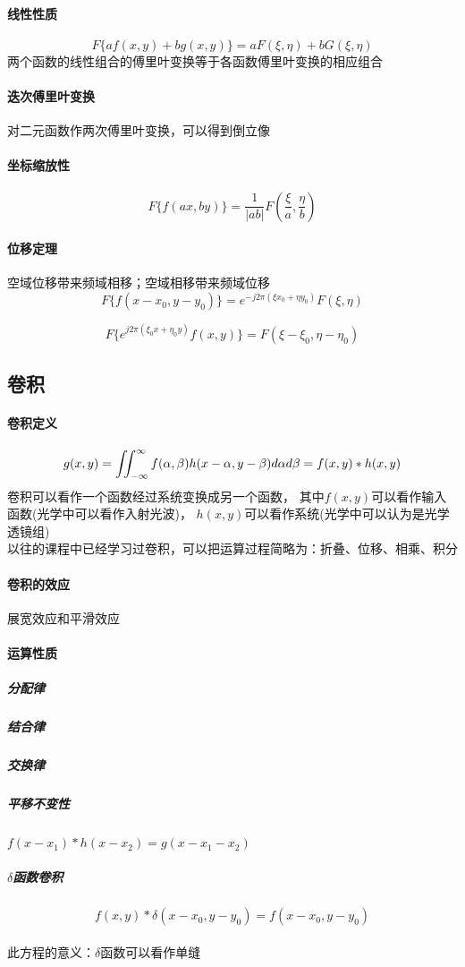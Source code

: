 \documentclass[UTF8]{ctexart}
\newcommand{\f}[2]{\frac{#1}{#2}}%
\begin{document}
\paragraph{线性性质}
\[
    F\{ af(x,y)+bg(x,y)\}=aF(\xi,\eta)+bG(\xi,\eta)
\]
两个函数的线性组合的傅里叶变换等于各函数傅里叶变换的相应组合
\paragraph{迭次傅里叶变换}
对二元函数作两次傅里叶变换，可以得到倒立像
\paragraph{坐标缩放性}
\[
F\{f(ax,by)\} =\f{1}{|ab|}F(\f{\xi}{a},\f{\eta}{b})   
\]
\paragraph{位移定理}空域位移带来频域相移；空域相移带来频域位移\[
F\{f(x-x_{0},y-y_{0})\}=e^{-j2\pi(\xi x_{0}+\eta y_{0})}F(\xi,\eta)    
\]

\[F\{e^{j2\pi(\xi_{0}x+\eta_{0}y)} f(x,y)\}=F(\xi-\xi_{0},\eta-\eta_{0})\]
\subsection{卷积}
\paragraph{卷积定义}\[g(x,y)=\iint_{-\infty}^{\infty}f(\alpha,\beta)h(x-\alpha,y-\beta)d\alpha d\beta \\
=f(x,y)*h(x,y)
\]
卷积可以看作一个函数经过系统变换成另一个函数，
其中$f(x,y)$可以看作输入函数(光学中可以看作入射光波)，
$h(x,y)$可以看作系统(光学中可以认为是光学透镜组)
\\以往的课程中已经学习过卷积，可以把运算过程简略为：折叠、位移、相乘、积分
\paragraph{卷积的效应}展宽效应和平滑效应
\paragraph{运算性质}
\subparagraph{分配律}
\subparagraph{结合律}
\subparagraph{交换律}
\subparagraph{平移不变性}$f(x-x_{1})*h(x-x_{2})=g(x-x_{1}-x_{2})$
\subparagraph{$\delta$函数卷积}
\[f(x,y)*\delta(x-x_{0},y-y_{0})=f(x-x_{0},y-y_{0})\]
\\此方程的意义：$\delta$函数可以看作单缝
\end{document}
